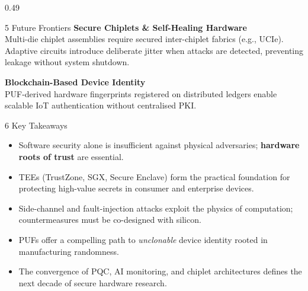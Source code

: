 \documentclass[final]{beamer}
\begin{document}
\begin{frame}[t]
\begin{columns}[t,totalwidth=\linewidth]
\begin{column}{0.49\linewidth}
\begin{exampleblock}{5 \; Future Frontiers}
    \medskip
    \textbf{\color{GreenOK}Secure Chiplets \& Self-Healing Hardware}\\
    Multi-die chiplet assemblies require secured inter-chiplet fabrics
    (e.g., UCIe). Adaptive circuits introduce deliberate jitter when
    attacks are detected, preventing leakage without system shutdown.

    \medskip
    \textbf{\color{GreenOK}Blockchain-Based Device Identity}\\
    PUF-derived hardware fingerprints registered on distributed ledgers
    enable scalable IoT authentication without centralised PKI.
  \end{exampleblock}

  \begin{block}{6 \; Key Takeaways}
    \begin{itemize}[leftmargin=1.2em, itemsep=0.4ex]
      \item[\color{PrimaryBlue}\textbullet]
        Software security alone is insufficient against physical
        adversaries; \textbf{hardware roots of trust} are essential.
      \item[\color{PrimaryBlue}\textbullet]
        TEEs (TrustZone, SGX, Secure Enclave) form the practical
        foundation for protecting high-value secrets in consumer and
        enterprise devices.
      \item[\color{PrimaryBlue}\textbullet]
        Side-channel and fault-injection attacks exploit the physics
        of computation; countermeasures must be co-designed with silicon.
      \item[\color{PrimaryBlue}\textbullet]
        PUFs offer a compelling path to \emph{unclonable} device
        identity rooted in manufacturing randomness.
      \item[\color{PrimaryBlue}\textbullet]
        The convergence of PQC, AI monitoring, and chiplet
        architectures defines the next decade of secure hardware research.
    \end{itemize}
  \end{block}


\end{column}
\end{columns}
\end{frame}
\end{document}

